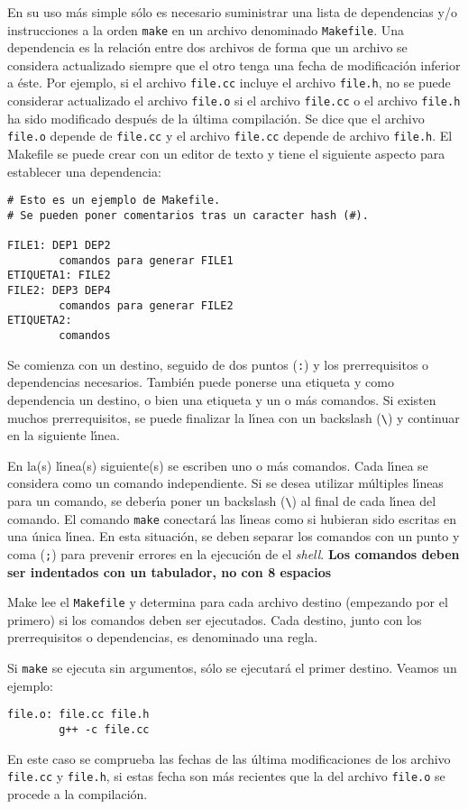 En su uso m{\'a}s simple s{\'o}lo es necesario suministrar una lista de
dependencias y/o instrucciones a la orden \verb+make+ en un archivo
denominado \verb+Makefile+.  Una dependencia es la relaci{\'o}n entre dos
archivos de forma que un archivo se considera actualizado siempre que
el otro tenga una fecha de modificaci{\'o}n inferior a {\'e}ste. Por ejemplo,
si el archivo \verb+file.cc+ incluye el archivo \verb+file.h+, no se
puede considerar actualizado el archivo \verb+file.o+ si el archivo
\verb+file.cc+ o el archivo \verb+file.h+ ha sido modificado despu{\'e}s
de la {\'u}ltima compilaci{\'o}n.  Se dice que el archivo \verb+file.o+
depende de \verb+file.cc+ y el archivo \verb+file.cc+ depende de
archivo \verb+file.h+. El Makefile se puede crear con un editor de
texto y tiene el siguiente aspecto para establecer una dependencia:
\begin{verbatim}
# Esto es un ejemplo de Makefile.
# Se pueden poner comentarios tras un caracter hash (#).

FILE1: DEP1 DEP2 
        comandos para generar FILE1 
ETIQUETA1: FILE2
FILE2: DEP3 DEP4 
        comandos para generar FILE2
ETIQUETA2: 
        comandos
\end{verbatim}
Se comienza con un destino, seguido de dos puntos (\verb+:+) y los
prerrequisitos o dependencias necesarios. Tambi{\'e}n puede ponerse una
etiqueta y como dependencia un destino, o bien una etiqueta y un o m{\'a}s
comandos. Si existen muchos prerrequisitos, se puede finalizar la l{\'\i}nea
con un backslash (\verb+\+) y continuar en la siguiente l{\'\i}nea.

En la(s) l{\'\i}nea(s) siguiente(s) se escriben uno o m{\'a}s comandos. Cada
l{\'\i}nea se considera como un comando independiente. Si se desea utilizar
m{\'u}ltiples l{\'\i}neas para un comando, se deber{\'\i}a poner un backslash
(\verb+\+) al final de cada l{\'\i}nea del comando. El comando \verb+make+
conectar{\'a} las l{\'\i}neas como si hubieran sido escritas en una {\'u}nica
l{\'\i}nea. En esta situaci{\'o}n, se deben separar los comandos con un punto y
coma (\verb+;+) para prevenir errores en la ejecuci{\'o}n de el {\it
  shell}. {\bf Los comandos deben ser indentados con un tabulador, no
  con 8 espacios}


Make lee el \verb+Makefile+ y determina para cada archivo destino
(empezando por el primero) si los comandos deben ser ejecutados. Cada
destino, junto con los prerrequisitos o dependencias, es denominado
una regla.

Si \verb+make+ se ejecuta sin argumentos, s{\'o}lo se ejecutar{\'a} el primer
destino. Veamos un ejemplo:
\begin{verbatim}
file.o: file.cc file.h
        g++ -c file.cc
\end{verbatim}
En este caso se comprueba las fechas de las {\'u}ltima modificaciones de
los archivo \verb+file.cc+ y \verb+file.h+, si estas fecha son m{\'a}s
recientes que la del archivo \verb+file.o+ se procede a la
compilaci{\'o}n.

